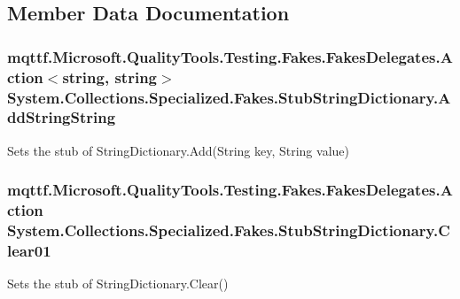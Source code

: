 \subsection{Member Data Documentation}
\hypertarget{class_system_1_1_collections_1_1_specialized_1_1_fakes_1_1_stub_string_dictionary_a41859ee3f12c494967dc3e341dbb02bb}{
\subsubsection[{Add\-String\-String}]{\setlength{\rightskip}{0pt plus 5cm}mqttf.\-Microsoft.\-Quality\-Tools.\-Testing.\-Fakes.\-Fakes\-Delegates.\-Action$<$string, string$>$ System.\-Collections.\-Specialized.\-Fakes.\-Stub\-String\-Dictionary.\-Add\-String\-String}}\label{class_system_1_1_collections_1_1_specialized_1_1_fakes_1_1_stub_string_dictionary_a41859ee3f12c494967dc3e341dbb02bb}


Sets the stub of String\-Dictionary.\-Add(\-String key, String value)

\hypertarget{class_system_1_1_collections_1_1_specialized_1_1_fakes_1_1_stub_string_dictionary_a2189841a974ce02c4ba0471a6c926539}{
\subsubsection[{Clear01}]{\setlength{\rightskip}{0pt plus 5cm}mqttf.\-Microsoft.\-Quality\-Tools.\-Testing.\-Fakes.\-Fakes\-Delegates.\-Action System.\-Collections.\-Specialized.\-Fakes.\-Stub\-String\-Dictionary.\-Clear01}}\label{class_system_1_1_collections_1_1_specialized_1_1_fakes_1_1_stub_string_dictionary_a2189841a974ce02c4ba0471a6c926539}


Sets the stub of String\-Dictionary.\-Clear()


